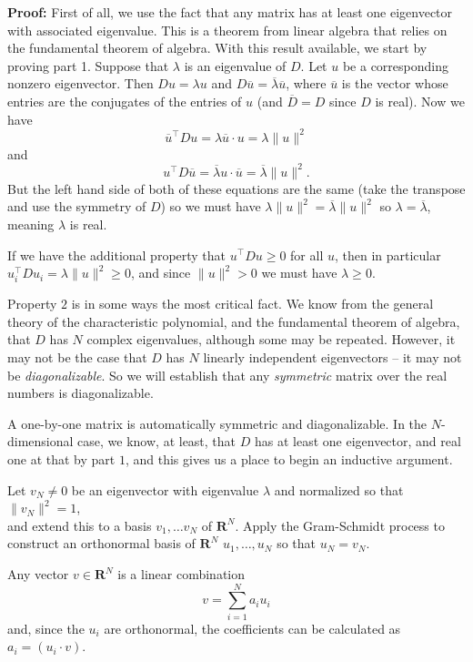 \documentclass[
  11pt,
  letterpaper,
]{scrbook}
\theoremstyle{plain}
\theoremstyle{plain}
\theoremstyle{remark}
\begin{document}
\textbf{Proof:} First of all, we use the fact that any matrix has at
least one eigenvector with associated eigenvalue. This is a theorem from
linear algebra that relies on the fundamental theorem of algebra. With
this result available, we start by proving part 1. Suppose that
\(\lambda\) is an eigenvalue of \(D\). Let \(u\) be a corresponding
nonzero eigenvector. Then \(Du=\lambda u\) and
\(D\overline{u}=\overline{\lambda}\overline{u}\), where \(\overline{u}\)
is the vector whose entries are the conjugates of the entries of \(u\)
(and \(\overline{D}=D\) since \(D\) is real). Now we have \[
\overline{u}^{\intercal}Du = \lambda \overline{u}\cdot u = \lambda\|u\|^2
\] and \[
u^{\intercal}D\overline{u} = \overline{\lambda}u\cdot \overline{u} = \overline{\lambda}\|u\|^2.
\] But the left hand side of both of these equations are the same (take
the transpose and use the symmetry of \(D\)) so we must have
\(\lambda\|u\|^2 = \overline{\lambda}\|u\|^2\) so
\(\lambda=\overline{\lambda}\), meaning \(\lambda\) is real.

If we have the additional property that \(u^{\intercal}Du\ge 0\) for all
\(u\), then in particular
\(u_{i}^{\intercal}Du_{i} = \lambda\|u\|^2\ge 0\), and since
\(\|u\|^2> 0\) we must have \(\lambda\ge 0\).

Property \(2\) is in some ways the most critical fact. We know from the
general theory of the characteristic polynomial, and the fundamental
theorem of algebra, that \(D\) has \(N\) complex eigenvalues, although
some may be repeated. However, it may not be the case that \(D\) has
\(N\) linearly independent eigenvectors -- it may not be
\emph{diagonalizable}. So we will establish that any \emph{symmetric}
matrix over the real numbers is diagonalizable.

A one-by-one matrix is automatically symmetric and diagonalizable. In
the \(N\)-dimensional case, we know, at least, that \(D\) has at least
one eigenvector, and real one at that by part \(1\), and this gives us a
place to begin an inductive argument.

Let \(v_{N}\not=0\) be an eigenvector with eigenvalue \(\lambda\) and
normalized so that \(\|v_{N}\|^2=1\),\\
and extend this to a basis \(v_{1},\ldots v_{N}\) of \(\mathbf{R}^{N}\).
Apply the Gram-Schmidt process to construct an orthonormal basis of
\(\mathbf{R}^{N}\) \(u_{1},\ldots, u_{N}\) so that \(u_{N}=v_{N}\).

Any vector \(v\in\mathbf{R}^{N}\) is a linear combination \[
v = \sum_{i=1}^{N} a_{i}u_{i}
\] and, since the \(u_{i}\) are orthonormal, the coefficients can be
calculated as \(a_{i}=(u_{i}\cdot v)\).
\end{document}
